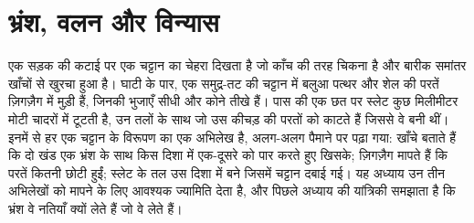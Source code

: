 \chapter{भ्रंश, वलन और विन्यास}\label{ch:b1:faults-folds-fabrics}

एक सड़क की कटाई पर एक चट्टान का चेहरा दिखता है जो काँच की तरह चिकना है और बारीक समांतर खाँचों से खुरचा हुआ है। घाटी के पार, एक समुद्र-तट की चट्टान में बलुआ पत्थर और शेल की परतें ज़िगज़ैग में मुड़ी हैं, जिनकी भुजाएँ सीधी और कोने तीखे हैं। पास की एक छत पर स्लेट कुछ मिलीमीटर मोटी चादरों में टूटती है, उन तलों के साथ जो उस कीचड़ की परतों को काटते हैं जिससे वे बनी थीं। इनमें से हर एक चट्टान के विरूपण का एक अभिलेख है, अलग-अलग पैमाने पर पढ़ा गया: खाँचे बताते हैं कि दो खंड एक भ्रंश के साथ किस दिशा में एक-दूसरे को पार करते हुए खिसके; ज़िगज़ैग मापते हैं कि परतें कितनी छोटी हुईं; स्लेट के तल उस दिशा में बने जिसमें चट्टान दबाई गई। यह अध्याय उन तीन अभिलेखों को मापने के लिए आवश्यक ज्यामिति देता है, और पिछले अध्याय की यांत्रिकी समझाता है कि भ्रंश वे नतियाँ क्यों लेते हैं जो वे लेते हैं।


